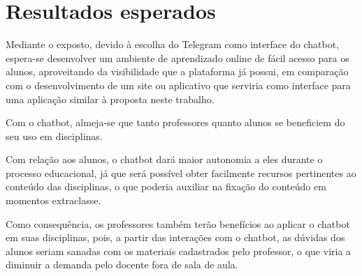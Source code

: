 \chapter{Resultados esperados}
\label{cap:resultados-esperados}

Mediante o exposto, devido à escolha do Telegram como interface do chatbot, espera-se desenvolver um ambiente de aprendizado online de fácil acesso para os alunos, aproveitando da visibilidade que a plataforma já possui, em comparação com o desenvolvimento de um site ou aplicativo que serviria como interface para uma aplicação similar à proposta neste trabalho.

Com o chatbot, almeja-se que tanto professores quanto alunos se beneficiem do seu uso em disciplinas.

Com relação aos alunos, o chatbot dará maior autonomia a eles durante o processo educacional, já que será possível obter facilmente recursos pertinentes ao conteúdo das disciplinas, o que poderia auxiliar na fixação do conteúdo em momentos extraclasse.

Como consequência, os professores também terão benefícios ao aplicar o chatbot em suas disciplinas, pois, a partir das interações com o chatbot, as dúvidas dos alunos seriam sanadas com os materiais cadastrados pelo professor, o que viria a diminuir a demanda pelo docente fora de sala de aula.